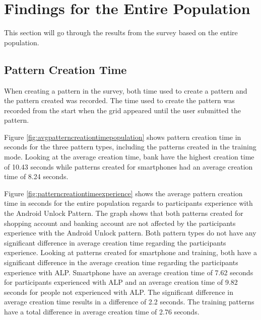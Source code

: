 \section{Findings for the Entire Population}
  
  This section will go through the results from the survey based on the entire population. 


	\subsection{Pattern Creation Time}
    When creating a pattern in the survey, both time used to create a pattern and the pattern created was recorded. The time used to create the pattern was recorded from the start when the grid appeared until the user submitted the pattern.

    Figure \ref{fig:avgpatterncreationtimepopulation} shows pattern creation time in seconds for the three pattern types, including the patterns created in the training mode. Looking at the average creation time, bank have the highest creation time of 10.43 seconds while patterns created for smartphones had an average creation time of 8.24 seconds. 

    Figure \ref{fig:patterncreationtimeexperience} shows the average pattern creation time in seconds for the entire population regards to participants experience with the Android Unlock Pattern. The graph shows that both patterns created for shopping account and banking account are not affected by the participants experience with the Android Unlock pattern. Both pattern types do not have any significant difference in average creation time regarding the participants experience. Looking at patterns created for smartphone and training, both have a significant difference in the average creation time regarding the participants experience with ALP. Smartphone have an average creation time of 7.62 seconds for participants experienced with ALP and an average creation time of 9.82 seconds for people not experienced with ALP. The significant difference in average creation time results in a difference of 2.2 seconds. The training patterns have a total difference in average creation time of 2.76 seconds.  

